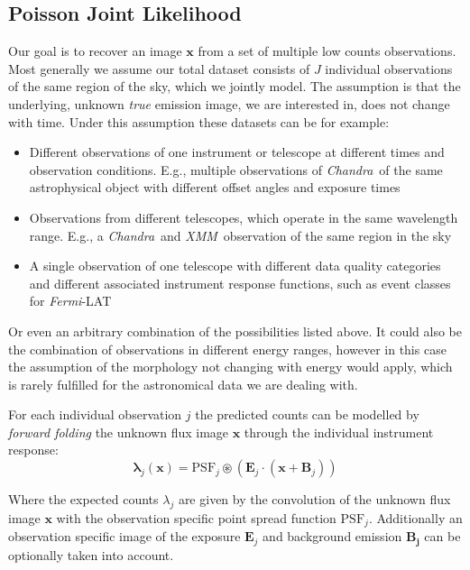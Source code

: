 \documentclass[twocolumn]{aastex631}
\newcommand{\chandra}{\textit{Chandra}~}
\newcommand{\xmm}{\textit{XMM}~}
\newcommand{\fermi}{\textit{Fermi}-LAT~}
\begin{document}
    \subsection{Poisson Joint Likelihood}
    Our goal is to recover an image $\mathbf{x}$ from a set of multiple low counts observations. Most generally we assume our total dataset consists of $J$ individual observations of the same region of the sky, which we jointly model. The assumption is that the underlying, unknown \textit{true} emission image, we are interested in, does not change with time. Under this assumption these datasets can be for example:

    \begin{itemize}
        \item Different observations of one instrument or telescope at different times and observation conditions. E.g., multiple observations of \chandra of the same astrophysical object with different offset angles and exposure times
        \item Observations from different telescopes, which operate in the same wavelength range. E.g., a \chandra and \xmm observation of the same region in the sky
        \item A single observation of one telescope with different data quality categories and different associated instrument response functions, such as event classes for \fermi
    \end{itemize}

    Or even an arbitrary combination of the possibilities listed above. It could also be the combination of observations in different energy ranges, however in this case the assumption of the morphology not changing with energy would apply, which is rarely fulfilled for the astronomical data we are dealing with.
    
    For each individual observation $j$ the predicted counts can be modelled by \textit{forward folding} the unknown flux image $\mathbf{x}$ through the individual instrument response:
    \begin{equation}
        \label{eq:model}
        \boldsymbol{\lambda}_j(\mathbf{x}) = \mathrm{PSF}_j \circledast \left(\mathbf{E}_j \cdot (\mathbf{x} + \mathbf{B}_j) \right)
    \end{equation}

    Where the expected counts $\lambda_j$ are given by the convolution of the unknown 
    flux image $\mathbf{x}$ with the observation specific point spread function $\mathrm{PSF}_j$. Additionally
    an observation specific image of the exposure $\mathbf{E}_j$ and background emission $\mathbf{B_j}$ can be
    optionally taken into account.
\end{document}
